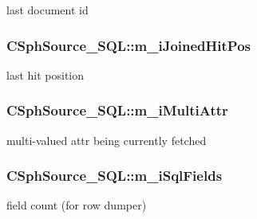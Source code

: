 last document id 

\hypertarget{structCSphSource__SQL_a5dc993ad2a0d01254d0da80600f7ef9a}{
\subsubsection[{m\-\_\-i\-Joined\-Hit\-Pos}]{ C\-Sph\-Source\-\_\-\-S\-Q\-L\-::m\-\_\-i\-Joined\-Hit\-Pos\hspace{0.3cm}{\ttfamily [protected]}}}\label{structCSphSource__SQL_a5dc993ad2a0d01254d0da80600f7ef9a}


last hit position 

\hypertarget{structCSphSource__SQL_a5ac61b46c7c45963bc415966f25c413d}{
\subsubsection[{m\-\_\-i\-Multi\-Attr}]{ C\-Sph\-Source\-\_\-\-S\-Q\-L\-::m\-\_\-i\-Multi\-Attr\hspace{0.3cm}{\ttfamily [protected]}}}\label{structCSphSource__SQL_a5ac61b46c7c45963bc415966f25c413d}


multi-\/valued attr being currently fetched 

\hypertarget{structCSphSource__SQL_aa9a5b3f39074872fcd92a73b3f2abb9a}{
\subsubsection[{m\-\_\-i\-Sql\-Fields}]{ C\-Sph\-Source\-\_\-\-S\-Q\-L\-::m\-\_\-i\-Sql\-Fields\hspace{0.3cm}{\ttfamily [protected]}}}\label{structCSphSource__SQL_aa9a5b3f39074872fcd92a73b3f2abb9a}


field count (for row dumper) 

